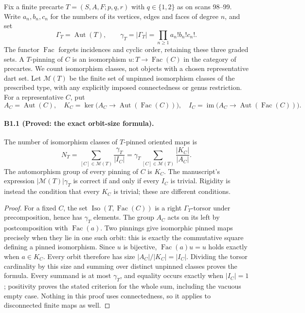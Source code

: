 Fix a finite precarte
$T=(S,A,F;p,q,r)$ with $q\in\{1,2\}$ as on scans 98--99.
Write $a_n,b_n,c_n$ for the numbers of its vertices, edges and faces of
degree $n$, and set
\[
 \Gamma_T=\operatorname{Aut}(T),\qquad
 \gamma_T=|\Gamma_T|=\prod_{n\geq1}a_n!b_n!c_n!.
\]
The functor $\operatorname{Fac}$ forgets incidences and cyclic order,
retaining these three graded sets. A $T$-pinning of $C$ is an isomorphism
$u:T\longrightarrow\operatorname{Fac}(C)$ in the category of precartes.
We count isomorphism classes, not objects with a chosen representative
dart set. Let $\mathcal M(T)$ be the finite set of unpinned isomorphism
classes of the prescribed type, with any explicitly imposed connectedness
or genus restriction. For a representative $C$, put
\[
 A_C=\operatorname{Aut}(C),\quad
 K_C=\ker\bigl(A_C\longrightarrow
              \operatorname{Aut}(\operatorname{Fac}(C))\bigr),\quad
 I_C=\operatorname{im}\bigl(A_C\longrightarrow
              \operatorname{Aut}(\operatorname{Fac}(C))\bigr).
\]

\paragraph{B1.1 (Proved: the exact orbit-size formula).}
The number of isomorphism classes of $T$-pinned oriented maps is
\begin{equation}\label{eq:B11}
 N_T=\sum_{[C]\in\mathcal M(T)}\frac{\gamma_T}{|I_C|}
     =\gamma_T\sum_{[C]\in\mathcal M(T)}\frac{|K_C|}{|A_C|}.
\end{equation}
The automorphism group of every pinning of $C$ is $K_C$.
The manuscript's expression $|\mathcal M(T)|\gamma_T$ is correct
if and only if every $I_C$ is trivial. Rigidity is instead the condition
that every $K_C$ is trivial; these are different conditions.

\begin{proof}
For a fixed $C$, the set
$\operatorname{Iso}(T,\operatorname{Fac}(C))$ is a right $\Gamma_T$-torsor
under precomposition, hence has $\gamma_T$ elements. The group $A_C$
acts on its left by postcomposition with $\operatorname{Fac}(a)$.
Two pinnings give isomorphic pinned maps precisely when they lie in
one such orbit: this is exactly the commutative square defining a pinned
isomorphism. Since $u$ is bijective,
$\operatorname{Fac}(a)u=u$ holds exactly when $a\in K_C$.
Every orbit therefore has size $|A_C|/|K_C|=|I_C|$. Dividing the
torsor cardinality by this size and summing over distinct unpinned
classes proves the formula. Every summand is at most $\gamma_T$,
and equality occurs exactly when $|I_C|=1$; positivity proves the stated
criterion for the whole sum, including the vacuous empty case.
Nothing in this proof uses connectedness, so it applies to disconnected
finite maps as well.
\end{proof}

